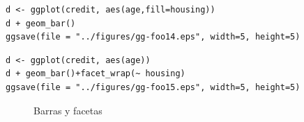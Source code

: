 \begin{verbatim}
d <- ggplot(credit, aes(age,fill=housing))
d + geom_bar()
ggsave(file = "../figures/gg-foo14.eps", width=5, height=5)
\end{verbatim}

\begin{verbatim}
d <- ggplot(credit, aes(age))
d + geom_bar()+facet_wrap(~ housing)
ggsave(file = "../figures/gg-foo15.eps", width=5, height=5)
\end{verbatim}

\begin{figure}[h]
 \begin{center}
 \hspace{0.1cm}
 \caption{Barras y facetas}
 \label{fig:barras}
 \end{center}
\end{figure}



